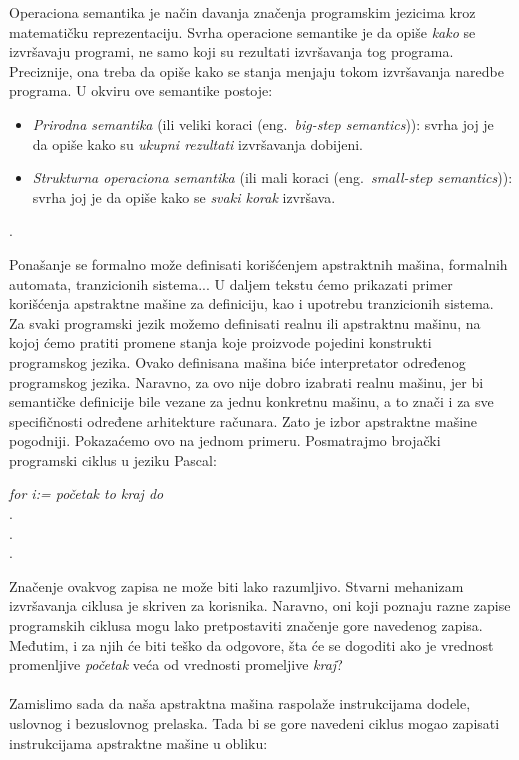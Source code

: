 \documentclass[a4paper]{article}
\begin{document}
{\qquad Operaciona semantika je način davanja značenja programskim jezicima kroz matematičku reprezentaciju. Svrha operacione semantike je da opiše \textit{kako} se izvršavaju programi, ne samo koji su rezultati izvršavanja tog programa. Preciznije, ona treba da opiše kako se stanja menjaju tokom izvršavanja naredbe programa. U okviru ove semantike postoje:
\begin{itemize}
	\item \textit{Prirodna semantika} (ili veliki koraci (eng.~{\em big-step semantics})): svrha joj je da opiše kako su \textit{ukupni rezultati} izvršavanja dobijeni.
	\item \textit{Strukturna operaciona semantika} (ili mali koraci (eng.~{\em small-step semantics})): svrha joj je da opiše kako se \textit{svaki korak} izvršava.
\end{itemize} \cite{wiley}.


Ponašanje se formalno može definisati korišćenjem apstraktnih mašina, formalnih automata, tranzicionih sistema... U daljem tekstu ćemo prikazati primer korišćenja apstraktne mašine za definiciju, kao i upotrebu tranzicionih sistema.\\

Za svaki programski jezik možemo definisati realnu ili apstraktnu mašinu, na kojoj ćemo pratiti promene stanja koje proizvode pojedini konstrukti programskog jezika. Ovako definisana mašina biće interpretator određenog programskog jezika. Naravno, za ovo nije dobro izabrati realnu mašinu, jer bi semantičke definicije bile vezane za jednu konkretnu mašinu, a to znači i za sve specifičnosti određene arhitekture računara. Zato je izbor apstraktne mašine pogodniji. Pokazaćemo ovo na jednom primeru. Posmatrajmo brojački programski ciklus u jeziku Pascal:\\

\begin{center}\textit{for i:= početak to kraj do}
\\.
\\.
\\.
\end{center}
\hfill \break
Značenje ovakvog zapisa ne može biti lako razumljivo. Stvarni mehanizam izvršavanja ciklusa je skriven za korisnika. Naravno, oni koji poznaju razne zapise programskih ciklusa mogu lako pretpostaviti značenje gore navedenog zapisa. Međutim, i za njih će biti teško da odgovore, šta će se dogoditi ako je vrednost promenljive \textit{početak} veća od vrednosti promeljive \textit{kraj}?\\
\\Zamislimo sada da naša apstraktna mašina raspolaže instrukcijama dodele, uslovnog i bezuslovnog prelaska. Tada bi se gore navedeni ciklus mogao zapisati instrukcijama apstraktne mašine u obliku:\\

}
\end{document}
